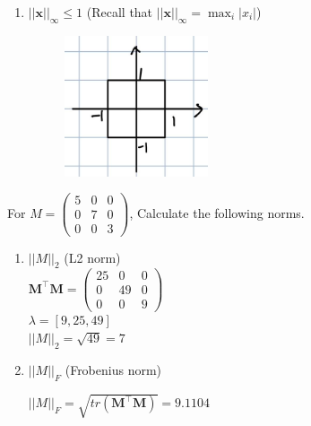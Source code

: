 \documentclass[a4paper]{article}
\theoremstyle{definition}
\newenvironment{soln}{
	\leavevmode\color{blue}\ignorespaces
}{}
\begin{document}
\begin{enumerate}
		\item 	$||\mathbf{x}||_\infty \leq 1$ (Recall that $||\mathbf{x}||_\infty = \max_i |x_i|$) \\
			\begin{soln}
			\begin{figure}[h!]
			    \centering
			    \includegraphics[width=0.4\textwidth]{Figure3.png}  
			    \captionsetup{labelformat=empty}
			    \caption{}
			    \label{fig:my_label}
			\end{figure}
		\end{soln}
	\end{enumerate}
	
	For $M = \begin{pmatrix}
		5 & 0 & 0 \\ 0 & 7 & 0 \\ 0 & 0 & 3
		
	\end{pmatrix}$, Calculate the following norms.
	\begin{enumerate}\addtocounter{enumi}{3}
		\item $||M||_{2}$ (L2 norm) \\
		\begin{soln}  $\mathbf{M}^\top\mathbf{M} = 
			\begin{pmatrix}
				25 & 0 & 0 \\ 0 & 49 & 0 \\ 0 & 0 & 9
			\end{pmatrix} 
			$ \\
			$\lambda = [9, 25, 49]$ \\
			$||M||_{2} = \sqrt{49} = 7$
		\end{soln}
		
		\item $||M||_{F}$ (Frobenius norm)\\
		\begin{soln}
			$||M||_{F} = \sqrt{tr(\mathbf{M}^\top\mathbf{M})} = 9.1104$
		\end{soln}
		
		
	\end{enumerate}
	
\end{document}
